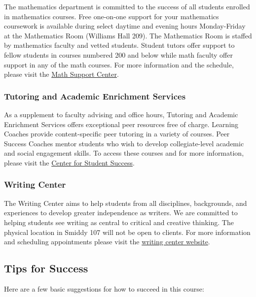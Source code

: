 \documentclass[
  letterpaper,
  DIV=11,
  numbers=noendperiod]{scrartcl}
\begin{document}
The mathematics department is committed to the success of all students
enrolled in mathematics courses. Free one-on-one support for your
mathematics coursework is available during select daytime and evening
hours Monday-Friday at the Mathematics Room (Williams Hall 209). The
Mathematics Room is staffed by mathematics faculty and vetted students.
Student tutors offer support to fellow students in courses numbered 200
and below while math faculty offer support in any of the math courses.
For more information and the schedule, please visit the
\href{https://www.ithaca.edu/academics/school-humanities-and-sciences/mathematics/courses-placement-resources/mathematics-support-center}{Math
Support Center}.

\subsubsection{Tutoring and Academic Enrichment
Services}\label{tutoring-and-academic-enrichment-services}

As a supplement to faculty advising and office hours, Tutoring and
Academic Enrichment Services offers exceptional peer resources free of
charge. Learning Coaches provide content-specific peer tutoring in a
variety of courses. Peer Success Coaches mentor students who wish to
develop collegiate-level academic and social engagement skills. To
access these courses and for more information, please visit the
\href{https://www.ithaca.edu/tutoring-services}{Center for Student
Success}.

\subsubsection{Writing Center}\label{writing-center}

The Writing Center aims to help students from all disciplines,
backgrounds, and experiences to develop greater independence as writers.
We are committed to helping students see writing as central to critical
and creative thinking. The physical location in Smiddy 107 will not be
open to clients. For more information and scheduling appointments please
visit the \href{https://ithaca.mywconline.com}{writing center website}.

\subsection{Tips for Success}\label{tips-for-success}

Here are a few basic suggestions for how to succeed in this course:
\end{document}
